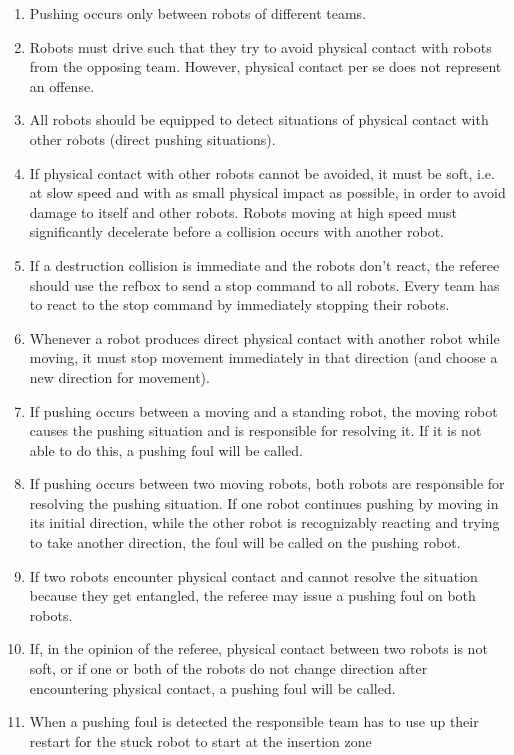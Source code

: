 \documentclass[12pt,twoside]{article}
\begin{document}
\begin{enumerate}
\item Pushing occurs only between robots of different teams.
\item Robots must drive such that they try to avoid physical contact
  with robots from the opposing team. However, physical contact per se
  does not represent an offense.
\item All robots should be equipped to detect situations of physical
  contact with other robots (direct pushing situations).
\item If physical contact with other robots cannot be avoided, it must
  be soft, i.e. at slow speed and with as small physical impact as
  possible, in order to avoid damage to itself and other
  robots. Robots moving at high speed must significantly decelerate
  before a collision occurs with another robot.
\item If a destruction collision is immediate and the robots don't
  react, the referee should use the refbox to send a stop command to
  all robots. Every team has to react to the stop command by
  immediately stopping their robots.
\item Whenever a robot produces direct physical contact with another
  robot while moving, it must stop movement immediately in that
  direction (and choose a new direction for movement).
\item If pushing occurs between a moving and a standing robot, the
  moving robot causes the pushing situation and is responsible for
  resolving it. If it is not able to do this, a pushing foul will be
  called.
\item If pushing occurs between two moving robots, both robots are
  responsible for resolving the pushing situation. If one robot
  continues pushing by moving in its initial direction, while the
  other robot is recognizably reacting and trying to take another
  direction, the foul will be called on the pushing robot.
\item If two robots encounter physical contact and cannot resolve the
  situation because they get entangled, the referee may issue a
  pushing foul on both robots.
\item If, in the opinion of the referee, physical contact between two
  robots is not soft, or if one or both of the robots do not change
  direction after encountering physical contact, a pushing foul will
  be called.
\item When a pushing foul is detected the responsible team has to use
  up their restart for the stuck robot to start at the insertion zone

\end{enumerate}
\end{document}

